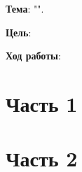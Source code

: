 \begin{center}
    \textbf{\titlePageTypeWork}
\end{center}

\textbf{Тема}: "\titlePageTopic".

\textbf{Цель}: 

\begin{center}
    \textbf{Ход работы}:
\end{center}

\section*{Часть 1}
    
    
    
\section*{Часть 2}
    
    
    
    
    
    
    
    
    
